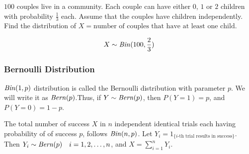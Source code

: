 \begin{example}
    $100$ couples live in a community. Each couple can have either $0$, $1$ or
$2$ children with probability $\frac{1}{3}$ each. Assume that the couples have
children independently. Find the distribution of $X = \text{number of couples
that have at least one child}$.
\end{example}
\begin{solution}
    \[ X \sim \text{\emph{Bin}}(100, \frac{2}{3}) \]
\end{solution}

\subsubsection*{Bernoulli Distribution}
$\text{\emph{Bin}}(1, p)$ distribution is called the Bernoulli distribution with
parameter $p$. We will write it as $\text{\emph{Bern}}(p)$.Thus, if $Y \sim
\text{\emph{Bern}}(p)$, then $P(Y = 1) = p$, and $P(Y = 0) = 1 - p$.

The total number of success $X$ in $n$ independent identical trials each
having probability of of success $p$, follows $\text{\emph{Bin}}(n, p)$. Let $Y_i =
1_{\lbrace i\text{-th trial results in success} \rbrace}$. Then $Y_i \sim
\text{\emph{Bern}}(p) \quad i = 1, 2, \dots, n$, and $X = \sum_{i = 1}^n Y_i$.

